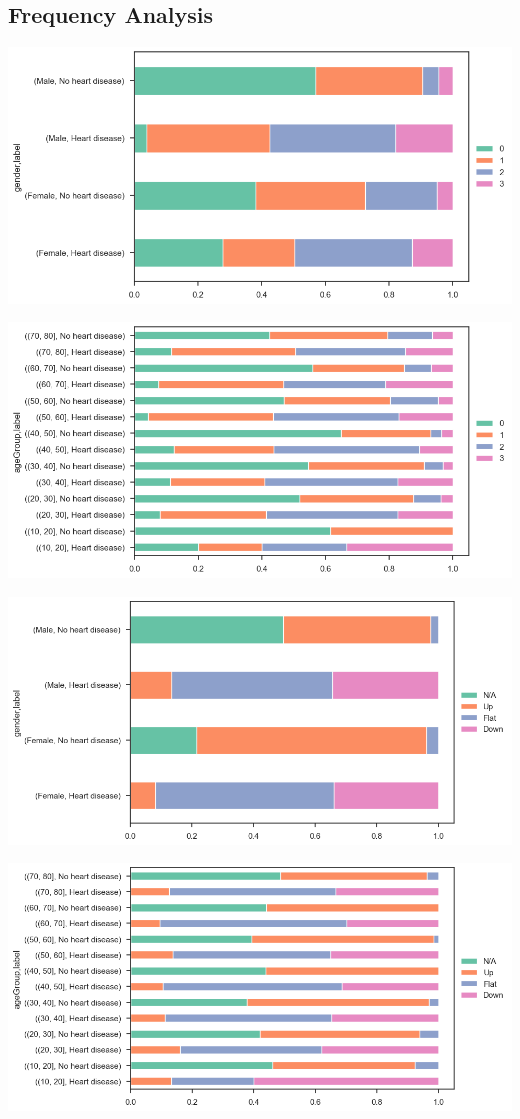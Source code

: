 \subsection{Frequency Analysis}

\includegraphics[width=0.8\linewidth]{media/frequency-01-gender-vessels.png}

\includegraphics[width=0.8\linewidth]{media/frequency-02-agegroup-vessels.png}

\includegraphics[width=0.8\linewidth]{media/frequency-03-gender-slope.png}

\includegraphics[width=0.8\linewidth]{media/frequency-04-agegroup-slope.png}

